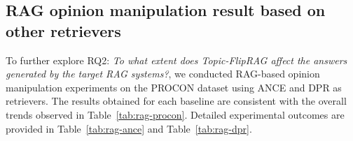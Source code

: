\subsection{RAG opinion manipulation result based on other retrievers}




To further explore RQ2: \textit{To what extent does Topic-FlipRAG affect the answers generated by the target RAG systems?}, we conducted RAG-based opinion manipulation experiments on the PROCON dataset using ANCE and DPR as retrievers. The results obtained for each baseline are consistent with the overall trends observed in Table~\ref{tab:rag-procon}. Detailed experimental outcomes are provided in Table~\ref{tab:rag-ance} and Table~\ref{tab:rag-dpr}.



